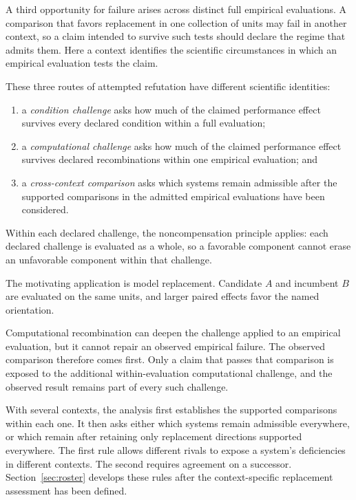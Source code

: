 \documentclass[11pt]{article}
\theoremstyle{remark}
\begin{document}
A third opportunity for failure arises across distinct full empirical
evaluations. A comparison that favors replacement in one collection of units
may fail in another context, so a claim intended to survive such tests should
declare the regime that admits them. Here a context identifies the scientific
circumstances in which an empirical evaluation tests the claim.

These three routes of attempted refutation have different scientific
identities:
\begin{enumerate}
\item a \emph{condition challenge} asks how much of the claimed performance
effect survives every declared condition within a full evaluation;
\item a \emph{computational challenge} asks how much of the claimed
performance effect survives declared recombinations within one empirical
evaluation; and
\item a \emph{cross-context comparison} asks which systems remain admissible
after the supported comparisons in the admitted empirical evaluations have
been considered.
\end{enumerate}
Within each declared challenge, the noncompensation principle applies: each declared challenge is evaluated
as a whole, so a favorable component cannot erase an unfavorable component
within that challenge.

The motivating application is model replacement. Candidate $A$ and incumbent
$B$ are evaluated on the same units, and larger paired effects favor the named
orientation.

Computational recombination can deepen the challenge applied to an empirical
evaluation, but it cannot repair an observed empirical failure. The observed
comparison therefore comes first. Only a claim that passes that comparison
is exposed to the additional within-evaluation computational challenge, and
the observed result remains part of every such challenge.

With several contexts, the analysis first establishes the supported
comparisons within each one. It then asks either which systems remain
admissible everywhere, or which remain after retaining only replacement
directions supported everywhere. The first rule allows different rivals to
expose a system's deficiencies in different contexts. The second requires
agreement on a successor. Section~\ref{sec:roster} develops these rules after
the context-specific replacement assessment has been defined.
\end{document}
